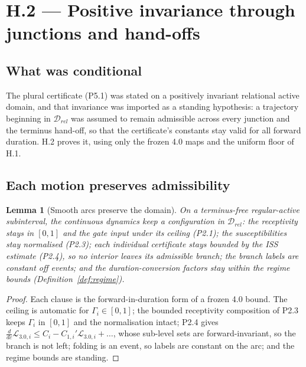 \documentclass[11pt,a4paper]{article}
\def\mathfrak#1{#1}%
\def\mathrm#1{#1}%
\def\emph#1{#1}%
\theoremstyle{definition}
\theoremstyle{plain}
\newtheorem{lemma}[definition]{Lemma}
\theoremstyle{remark}
\begin{document}
\section{H.2 --- Positive invariance through junctions and hand-offs}

\subsection{What was conditional}

The plural certificate (P5.1) was stated on a \emph{positively invariant} relational active
domain, and that invariance was imported as a standing hypothesis: a trajectory beginning in
\(\mathcal D_{\mathrm{rel}}\) was assumed to remain admissible across every junction and the
terminus hand-off, so that the certificate's constants stay valid for all forward duration.
H.2 proves it, using only the frozen 4.0 maps and the uniform floor of H.1.

\subsection{Each motion preserves admissibility}

\begin{lemma}[Smooth arcs preserve the domain]\label{lem:smooth}
On a terminus-free regular-active subinterval, the continuous dynamics keep a configuration
in \(\mathcal D_{\mathrm{rel}}\): the receptivity stays in \([0,1]\) and the gate input under
its ceiling (P2.1); the susceptibilities stay normalised (P2.3); each individual certificate
stays bounded by the ISS estimate (P2.4), so no interior leaves its admissible branch; the
branch labels are constant off events; and the duration-conversion factors stay within the
regime bounds (Definition~\ref{def:regime}).
\end{lemma}

\begin{proof}
Each clause is the forward-in-duration form of a frozen 4.0 bound. The ceiling is automatic
for \(\Gamma_i\in[0,1]\); the bounded receptivity composition of P2.3 keeps \(\Gamma_i\) in
\([0,1]\) and the normalisation intact; P2.4 gives
\(\tfrac{d}{d\mathfrak c}\mathcal L_{3.0,i}\le C_i-C_{1,i}'\mathcal L_{3.0,i}+\dots\), whose
sub-level sets are forward-invariant, so the branch is not left; folding is an event, so
labels are constant on the arc; and the regime bounds are standing. \qedhere
\end{proof}
\end{document}
